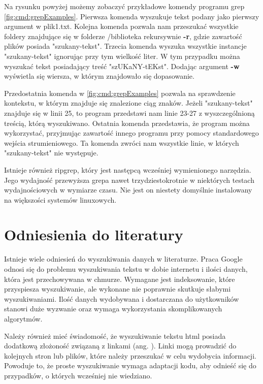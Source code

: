 Na rysunku powyżej możemy zobaczyć przykładowe komendy programu grep 
\ref{fig:cmd:grepExamples}. Pierwsza komenda wyszukuje tekst podany jako 
pierwszy argument w plik1.txt. Kolejna komenda pozwala nam przeszukać wszystkie 
foldery znajdujące się w folderze /biblioteka rekursywnie \textbf{-r}, gdzie 
zawartość plików posiada "szukany-tekst". Trzecia komenda wyszuka wszystkie 
instancje "szukany-tekst" ignorując przy tym wielkość liter. W tym przypadku 
można wyszukać tekst posiadający treść "szUKaNY-tEKst". Dodając argument \textbf{-w}
wyświetla się wiersza, w którym znajdowało się dopasowanie. 

Przedostatnia komenda w \ref{fig:cmd:grepExamples} pozwala na sprawdzenie 
kontekstu, w którym znajduje się znalezione ciąg znaków. Jeżeli "szukany-tekst" 
znajduje się w linii 25, to program przedstawi nam linie 23-27 z wyszczególnioną
treścią, którą wyszukiwano. Ostatnia komenda przedstawia, że program można 
wykorzystać, przyjmując zawartość innego programu przy pomocy standardowego 
wejścia strumieniowego. Ta komenda zwróci nam wszystkie linie, w których 
"szukany-tekst" nie występuje.

Istnieje również ripgrep, który jest następcą wcześniej wymienionego
narzędzia. Jego wydajność przewyższa grepa nawet trzydziestokrotnie w niektórych
testach wydajnościowych w wymiarze czasu. Nie jest on niestety domyślnie 
instalowany na większości systemów linuxowych. 

\section{Odniesienia do literatury}

Istnieje wiele odniesień do wyszukiwania danych w literaturze. Praca Google 
\cite{bib:internet:htmlSearchGoogle} odnosi się do problemu wyszukiwania tekstu 
w dobie internetu i ilości danych, która jest przechowywana w chmurze. Wymagane
jest indeksowanie, które przyspiesza wyszukiwanie, ale wykonane nie poprawnie 
skutkuje słabymi wyszukiwaniami. Ilość danych wydobywana i dostarczana do
użytkowników stanowi duże wyzwanie oraz wymaga wykorzystania skomplikowanych 
algorytmów. 

Należy również mieć świadomość, że wyszukiwanie tekstu html posiada dodatkową 
złożoność związaną z linkami (ang. ). Linki mogą prowadzić do 
kolejnych stron lub plików, które należy przeszukać w celu wydobycia informacji.
Powoduje to, że proste wyszukiwanie wymaga adaptacji kodu, aby odnieść się do 
przypadków, o których wcześniej nie wiedziano.


